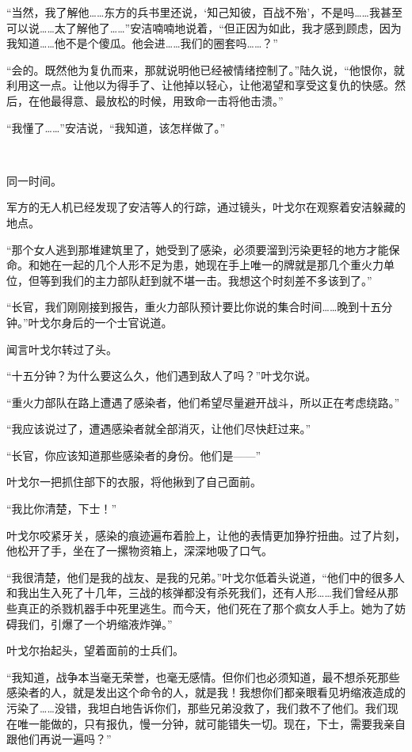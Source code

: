 “当然，我了解他……东方的兵书里还说，‘知己知彼，百战不殆’，不是吗……我甚至可以说……太了解他了……”安洁喃喃地说着，“但正因为如此，我才感到顾虑，因为我知道……他不是个傻瓜。他会进……我们的圈套吗……？”

“会的。既然他为复仇而来，那就说明他已经被情绪控制了。”陆久说，“他恨你，就利用这一点。让他以为得手了、让他掉以轻心，让他渴望和享受这复仇的快感。然后，在他最得意、最放松的时候，用致命一击将他击溃。”

“我懂了……”安洁说，“我知道，该怎样做了。”

 

同一时间。

军方的无人机已经发现了安洁等人的行踪，通过镜头，叶戈尔在观察着安洁躲藏的地点。

“那个女人逃到那堆建筑里了，她受到了感染，必须要溜到污染更轻的地方才能保命。和她在一起的几个人形不足为患，她现在手上唯一的牌就是那几个重火力单位，但等到我们的主力部队赶到就不堪一击。我想这个时刻差不多该到了。”

“长官，我们刚刚接到报告，重火力部队预计要比你说的集合时间……晚到十五分钟。”叶戈尔身后的一个士官说道。

闻言叶戈尔转过了头。

“十五分钟？为什么要这么久，他们遇到敌人了吗？”叶戈尔说。

“重火力部队在路上遭遇了感染者，他们希望尽量避开战斗，所以正在考虑绕路。”

“我应该说过了，遭遇感染者就全部消灭，让他们尽快赶过来。”

“长官，你应该知道那些感染者的身份。他们是——”

叶戈尔一把抓住部下的衣服，将他揪到了自己面前。

“我比你清楚，下士！”

叶戈尔咬紧牙关，感染的痕迹遍布着脸上，让他的表情更加狰狞扭曲。过了片刻，他松开了手，坐在了一摞物资箱上，深深地吸了口气。

“我很清楚，他们是我的战友、是我的兄弟。”叶戈尔低着头说道，“他们中的很多人和我出生入死了十几年，三战的核弹都没有杀死我们，还有人形……我们曾经从那些真正的杀戮机器手中死里逃生。而今天，他们死在了那个疯女人手上。她为了妨碍我们，引爆了一个坍缩液炸弹。”

叶戈尔抬起头，望着面前的士兵们。

“我知道，战争本当毫无荣誉，也毫无感情。但你们也必须知道，最不想杀死那些感染者的人，就是发出这个命令的人，就是我！我想你们都亲眼看见坍缩液造成的污染了……没错，我坦白地告诉你们，那些兄弟没救了，我们救不了他们。我们现在唯一能做的，只有报仇，慢一分钟，就可能错失一切。现在，下士，需要我亲自跟他们再说一遍吗？”

